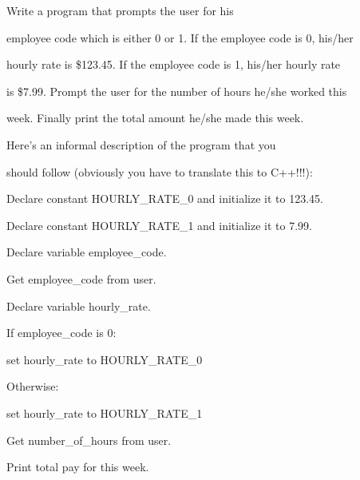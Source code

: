  Write a program that prompts the user for his

employee code which is either 0 or 1. If the employee code is 0, his/her

hourly rate is \$123.45. If the employee code is 1, his/her hourly rate

is \$7.99. Prompt the user for the number of hours he/she worked this

week. Finally print the total amount he/she made this week.

Here's an informal description of the program that you

should follow (obviously you have to translate this to C++!!!):

\begin{console}

Declare constant HOURLY_RATE_0 and initialize it to 123.45.

Declare constant HOURLY_RATE_1 and initialize it to 7.99.



Declare variable employee_code.

Get employee_code from user.



Declare variable hourly_rate.

If employee_code is 0:

   set hourly_rate to HOURLY_RATE_0

Otherwise:

        set hourly_rate to HOURLY_RATE_1

        

Get number_of_hours from user.

Print total pay for this week.

\end{console}

